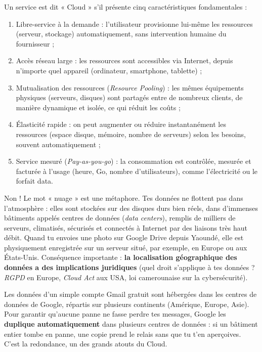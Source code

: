 \documentclass[11pt]{article}
\newcommand{\cle}[1]{{\popxbold\color{popdark}#1}}
\begin{document}
\begin{propriete}
Un service est dit « Cloud » s'il présente cinq caractéristiques fondamentales :
\begin{enumerate}
\item \cle{Libre-service à la demande} : l'utilisateur provisionne lui-même les ressources (serveur, stockage) automatiquement, sans intervention humaine du fournisseur ;
\item \cle{Accès réseau large} : les ressources sont accessibles via Internet, depuis n'importe quel appareil (ordinateur, smartphone, tablette) ;
\item \cle{Mutualisation des ressources} (\emph{Resource Pooling}) : les mêmes équipements physiques (serveurs, disques) sont partagés entre de nombreux clients, de manière dynamique et isolée, ce qui réduit les coûts ;
\item \cle{Élasticité rapide} : on peut augmenter ou réduire instantanément les ressources (espace disque, mémoire, nombre de serveurs) selon les besoins, souvent automatiquement ;
\item \cle{Service mesuré} (\emph{Pay-as-you-go}) : la consommation est contrôlée, mesurée et facturée à l'usage (heure, Go, nombre d'utilisateurs), comme l'électricité ou le forfait data.
\end{enumerate}
\end{propriete}

\begin{attention}
Non ! Le mot « nuage » est une métaphore. Tes données ne flottent pas dans l'atmosphère : elles sont stockées sur des disques durs bien réels, dans d'immenses bâtiments appelés \cle{centres de données} (\emph{data centers}), remplis de milliers de serveurs, climatisés, sécurisés et connectés à Internet par des liaisons très haut débit. Quand tu envoies une photo sur Google Drive depuis Yaoundé, elle est physiquement enregistrée sur un serveur situé, par exemple, en Europe ou aux États-Unis. Conséquence importante : \textbf{la localisation géographique des données a des implications juridiques} (quel droit s'applique à tes données ? \emph{RGPD} en Europe, \emph{Cloud Act} aux USA, loi camerounaise sur la cybersécurité).
\end{attention}

\begin{savaistu}
Les données d'un simple compte Gmail gratuit sont hébergées dans les centres de données de Google, répartis sur plusieurs continents (Amérique, Europe, Asie). Pour garantir qu'aucune panne ne fasse perdre tes messages, Google les \textbf{duplique automatiquement} dans plusieurs centres de données : si un bâtiment entier tombe en panne, une copie prend le relais sans que tu t'en aperçoives. C'est la \cle{redondance}, un des grands atouts du Cloud.
\end{savaistu}
\end{document}
